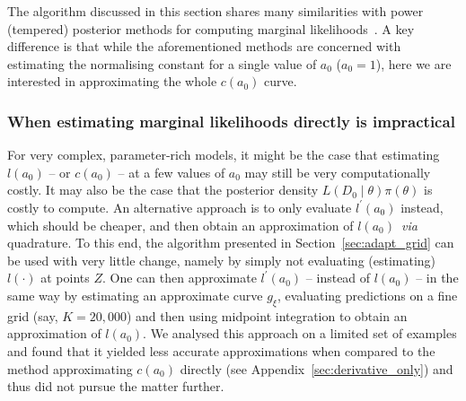 \documentclass[a4paper, notitlepage, 11pt]{article}
\begin{document}
The algorithm discussed in this section shares many similarities with power (tempered) posterior methods for computing marginal likelihoods~\citep{Gelman1998, Friel2008}.
A key difference is that while the aforementioned methods are concerned with estimating the normalising constant for a single value of $a_0$ ($a_0 = 1$), here we are interested in approximating the whole $c(a_0)$ curve.



\subsubsection{When estimating marginal likelihoods directly is impractical}
\label{sec:adapt_grid_derivOnly}

For very complex, parameter-rich models, it might be the case that estimating $l(a_0)$ -- or $c(a_0)$ -- at a few values of $a_0$ may still be very computationally costly.
It may also be the case that the posterior density $L(D_0 \mid \theta)\pi(\theta)$ is costly to compute.
An alternative approach is to only evaluate $l^\prime(a_0)$ instead, which should be cheaper, and then obtain an approximation of $l(a_0)$~\textit{via} quadrature.
To this end, the algorithm presented in Section~\ref{sec:adapt_grid} can be used with very little change, namely by simply not evaluating (estimating) $l(\cdot)$ at points $Z$.
One can then approximate $l^\prime(a_0)$ -- instead of $l(a_0)$ -- in the same way by estimating an approximate curve $g_\xi$, evaluating predictions on a fine grid (say, $K = 20, 000$) and then using midpoint integration to obtain an approximation of $l(a_0)$.
We analysed this approach on a limited set of examples and found that it yielded less accurate approximations when compared to the method approximating $c(a_0)$ directly (see Appendix~\ref{sec:derivative_only}) and thus did not pursue the matter further.
\end{document}
